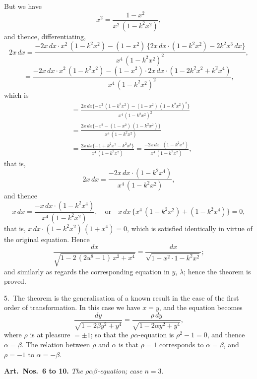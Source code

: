 \documentclass[11pt,a4paper]{book}
\begin{document}
But we have
\[
x^2 = \frac{1 - x^2}{x^2\, (1 - k^2 x^2)},
\]
and thence, differentiating,
\[
2x\, dx
= \frac{-2x\, dx \cdot x^2\, (1 - k^2 x^2) - (1 - x^2)\, \{2x\, dx \cdot (1 - k^2 x^2) - 2k^2 x^3\, dx\}}
{x^4\, (1 - k^2 x^2)^2},
\]
\[
= \frac{-2x\, dx \cdot x^2\, (1 - k^2 x^2) - (1 - x^2) \cdot 2x\, dx \cdot (1 - 2k^2 x^2 + k^2 x^4)}
{x^4\, (1 - k^2 x^2)^2},
\]
which is
\begin{align*}
&= \frac{2x\, dx \{-x^2\, (1 - k^2 x^2) - (1 - x^2)\, (1 - k^2 x^2)^2\}}
{x^4\, (1 - k^2 x^2)^2}\\
&= \frac{2x\, dx \{-x^2 - (1 - x^2)\, (1 - k^2 x^2)\}}{x^4\, (1 - k^2 x^2)}\\
&= \frac{2x\, dx \{-1 + k^2 x^2 - k^2 x^4\}}{x^4\, (1 - k^2 x^2)}
= \frac{-2x\, dx \cdot (1 - k^2 x^4)}{x^4\, (1 - k^2 x^2)},
\end{align*}
that is,
\[
2x\, dx = \frac{-2x\, dx \cdot (1 - k^2 x^4)}{x^4\, (1 - k^2 x^2)},
\]
and thence
\[
x\, dx = \frac{-x\, dx \cdot (1 - k^2 x^4)}{x^4\, (1 - k^2 x^2)},
\quad \text{or} \quad x\, dx\, \{x^4\, (1 - k^2 x^2) + (1 - k^2 x^4)\} = 0,
\]
that is, $x\, dx \cdot (1 - k^2 x^2)\, (1 + x^4) = 0$, which is satisfied identically in virtue of the
original equation. Hence
\[
\frac{dx}{\sqrt{1 - 2\, (2u^8 - 1)\, x^2 + x^4}}
= \frac{dx}{\sqrt{1 - x^2 \cdot 1 - k^2 x^2}};
\]
and similarly as regards the corresponding equation in $y$, $\lambda$; hence the theorem is proved.

5.\ The theorem is the generalisation of a known result in the case of the first
order of transformation. In this case we have $x = y$, and the equation becomes
\[
\frac{dy}{\sqrt{1 - 2\beta y^2 + y^4}}
= \frac{\rho\, dy}{\sqrt{1 - 2\alpha y^2 + y^4}},
\]
where $\rho$ is at pleasure $= \pm 1$; so that the $\rho\alpha$-equation is $\rho^2 - 1 = 0$, and thence
$\alpha = \beta$. The relation between $\rho$ and $\alpha$ is that $\rho = 1$ corresponds to $\alpha = \beta$,
and $\rho = -1$ to $\alpha = -\beta$.

\newpage
\noindent\textbf{Art.\ Nos.\ 6 to 10.} \textit{The $\rho\alpha\beta$-equation; case $n=3$.}
\end{document}
